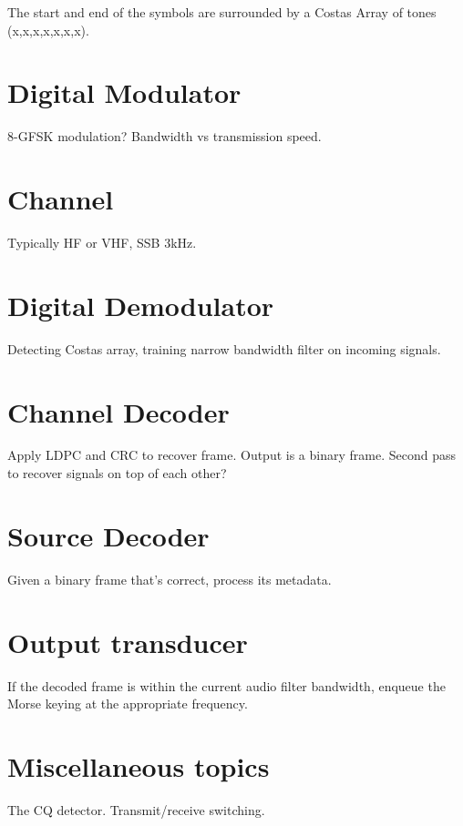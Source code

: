 \documentclass[a4paper]{tufte-handout}
\begin{document}


The start and end of the symbols are surrounded by a Costas Array of tones (x,x,x,x,x,x,x). \cite{Hasselbeck2019}



\section{Digital Modulator}
8-GFSK modulation? Bandwidth vs transmission speed.

\section{Channel}
Typically HF or VHF, SSB 3kHz.

\section{Digital Demodulator}
Detecting Costas array, training narrow bandwidth filter on incoming signals. 

\section{Channel Decoder}
Apply LDPC and CRC to recover frame. Output is a binary frame.
Second pass to recover signals on top of each other?

\section{Source Decoder}
Given a binary frame that's correct, process its metadata.

\section{Output transducer}
If the decoded frame is within the current audio filter bandwidth, enqueue the Morse keying at the appropriate frequency.

\section{Miscellaneous topics}
The CQ detector. Transmit/receive switching.
\end{document}
